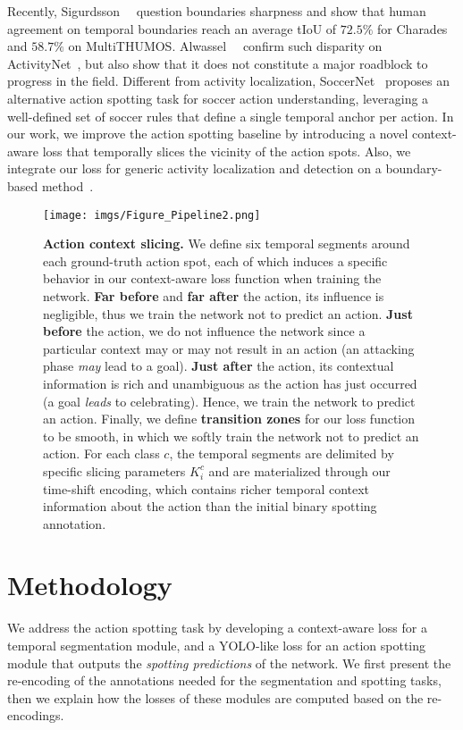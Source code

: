 \documentclass[10pt,twocolumn,letterpaper]{article}
\begin{document}
Recently, Sigurdsson~\etal~\cite{sigurdsson2017actions} question boundaries sharpness and show that human agreement on temporal boundaries reach an average tIoU of $72.5\%$ for Charades~\cite{sigurdsson2016hollywood} and $58.7\%$ on MultiTHUMOS\cite{yeung2018every}. Alwassel~\etal~\cite{alwassel2018diagnosing} confirm such disparity on ActivityNet~\cite{caba2015activitynet}, but also show that it does not constitute a major roadblock to progress in the field. Different from activity localization, SoccerNet~\cite{Giancola_2018_CVPR_Workshops} proposes an alternative action spotting task for soccer action understanding, leveraging a well-defined set of soccer rules that define a single temporal anchor per action. In our work, we improve the \SoccerNet action spotting baseline by introducing a novel context-aware loss that temporally slices the vicinity of the action spots.
Also, we integrate our loss for generic activity localization and detection on a boundary-based method~\cite{Lin_2019_ICCV,Lin_2018_ECCV}. \begin{figure*}[t]
    \centering
    \texttt{[image: imgs/Figure\_Pipeline2.png]}
    \caption{\textbf{Action context slicing.}
    We define six temporal segments around each ground-truth action spot, each of which induces a specific behavior in our context-aware loss function when training the network. {\color{myred}\textbf{Far before}} and {\color{myred}\textbf{far after}} the action, its influence is negligible, thus we train the network not to predict an action. {\color{mygray}\textbf{Just before}} the action, we do not influence the network since a particular context may or may not result in an action (\ie an attacking phase \textit{may} lead to a goal). {\color{mygreen}\textbf{Just after}} the action, its contextual information is rich and unambiguous as the action has just occurred (\ie a goal \textit{leads} to celebrating). Hence, we train the network to predict an action. Finally, we define {\color{myorange}\textbf{transition zones}} for our loss function to be smooth, in which we softly train the network not to predict an action. For each class $c$, the temporal segments are delimited by specific slicing parameters $K_i^c$ and are materialized through our time-shift encoding, which contains richer temporal context information about the action than the initial binary spotting annotation.
    }
    \label{fig:ActionSequencing}
\end{figure*}

\section{Methodology}
\label{sec:Method}
We address the action spotting task by developing a context-aware loss for a temporal segmentation module, and a YOLO-like loss for an action spotting module that outputs the \emph{spotting predictions} of the network. We first present the re-encoding of the annotations needed for the segmentation and spotting tasks,
then we explain how the losses of these modules are computed based on the re-encodings.
\end{document}
